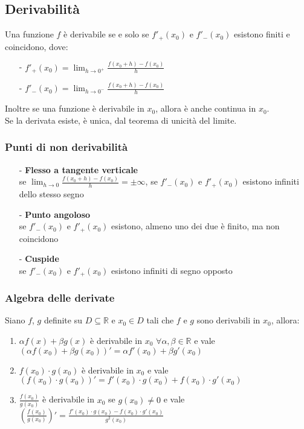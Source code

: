 \documentclass[a4paper]{article}
\begin{document}
\subsection{Derivabilità}
Una funzione \(f\) è derivabile se e solo se \(f'_+(x_0)\) e \(f'_-(x_0)\) esistono finiti e coincidono, dove:
\begin{itemize} [topsep=3pt, itemsep=0pt]
	\item[-] \(f'_+(x_0) = \displaystyle \lim_{h \to 0^+} \frac{f(x_0 + h) - f(x_0)}{h}\)
	\item[-] \(f'_-(x_0) = \displaystyle \lim_{h \to 0^-} \frac{f(x_0 + h) - f(x_0)}{h}\)
\end{itemize}
Inoltre se una funzione è derivabile in \(x_0\), allora è anche continua in \(x_0\). \\
Se la derivata esiste, è unica, dal teorema di unicità del limite. 


\subsubsection*{Punti di non derivabilità}
\begin{itemize}
	\item[-] \textbf{Flesso a tangente verticale} \\
	se \(\displaystyle \lim_{h \to 0} \frac{f(x_0 + h) - f(x_0)}{h} = \pm \infty\), se \(f'_-(x_0)\) e \(f'_+(x_0)\) esistono infiniti dello stesso segno
	\item[-] \textbf{Punto angoloso} \\
	se \(f'_-(x_0)\) e \(f'_+(x_0)\) esistono, almeno uno dei due è finito, ma non coincidono
	\item[-] \textbf{Cuspide} \\
	se \(f'_-(x_0)\) e \(f'_+(x_0)\) esistono infiniti di segno opposto
\end{itemize}

\newpage

\subsubsection*{Algebra delle derivate}
Siano \(f\), \(g\) definite su \(D \subseteq \mathbb{R}\) e \(x_0 \in D\) tali che \(f\) e \(g\) sono derivabili in \(x_0\), allora:
\begin{enumerate}
	\item \(\alpha f(x) + \beta g(x)\) è derivabile in \(x_0\) \(\forall \alpha, \beta \in \mathbb{R}\) e vale \(\left(\alpha f(x_0) + \beta g(x_0)\right)' = \alpha f'(x_0) + \beta g'(x_0)\)
	\item \(f(x_0) \cdot g(x_0)\) è derivabile in \(x_0\) e vale \(\left(f(x_0) \cdot g(x_0)\right)' = f'(x_0) \cdot g(x_0) + f(x_0) \cdot g'(x_0)\)
	\item \(\displaystyle \frac{f(x_0)}{g(x_0)}\) è derivabile in \(x_0\) se \(g(x_0) \neq 0\) e vale \(\displaystyle \left(\frac{f(x_0)}{g(x_0)}\right)' = \frac{f'(x_0) \cdot g(x_0) - f(x_0) \cdot g'(x_0)}{g^2(x_0)}\)
\end{enumerate}
\end{document}
